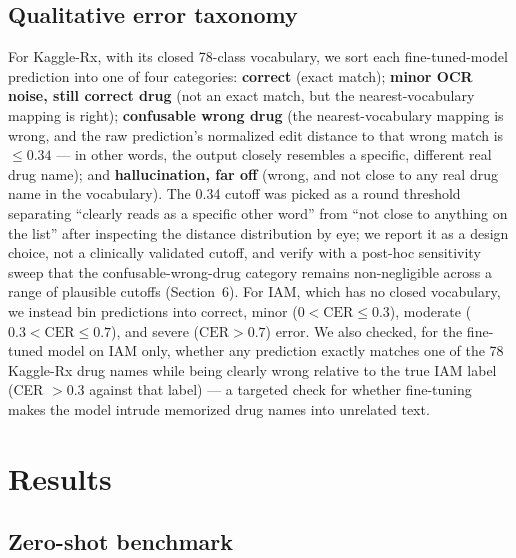 \documentclass[12pt]{article}
\begin{document}
\subsection{Qualitative error taxonomy}

For Kaggle-Rx, with its closed 78-class vocabulary, we sort each fine-tuned-model prediction into one of
four categories: \textbf{correct} (exact match); \textbf{minor OCR noise, still correct drug} (not an exact
match, but the nearest-vocabulary mapping is right); \textbf{confusable wrong drug} (the nearest-vocabulary
mapping is wrong, and the raw prediction's normalized edit distance to that wrong match is $\leq 0.34$ ---
in other words, the output closely resembles a specific, different real drug name); and
\textbf{hallucination, far off} (wrong, and not close to any real drug name in the vocabulary). The 0.34
cutoff was picked as a round threshold separating ``clearly reads as a specific other word'' from ``not
close to anything on the list'' after inspecting the distance distribution by eye; we report it as a design
choice, not a clinically validated cutoff, and verify with a post-hoc sensitivity sweep that the
confusable-wrong-drug category remains non-negligible across a range of plausible cutoffs (Section~6). For IAM, which has no closed vocabulary, we instead
bin predictions into correct, minor ($0 < \text{CER} \leq 0.3$), moderate ($0.3 < \text{CER} \leq 0.7$), and
severe ($\text{CER} > 0.7$) error. We also checked, for the fine-tuned model on IAM only, whether any
prediction exactly matches one of the 78 Kaggle-Rx drug names while being clearly wrong relative to the true
IAM label (CER $> 0.3$ against that label) --- a targeted check for whether fine-tuning makes the model
intrude memorized drug names into unrelated text.

\section{Results}

\subsection{Zero-shot benchmark}
\end{document}
